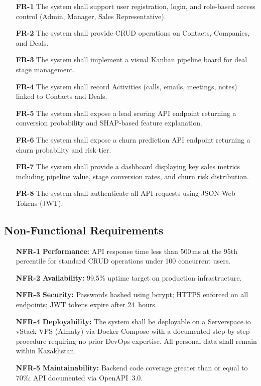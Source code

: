 \begin{itemize}
  \item[\textbf{FR-1}] The system shall support user registration, login,
  and role-based access control (Admin, Manager, Sales Representative).
  \item[\textbf{FR-2}] The system shall provide CRUD operations on
  Contacts, Companies, and Deals.
  \item[\textbf{FR-3}] The system shall implement a visual Kanban pipeline
  board for deal stage management.
  \item[\textbf{FR-4}] The system shall record Activities (calls, emails,
  meetings, notes) linked to Contacts and Deals.
  \item[\textbf{FR-5}] The system shall expose a lead scoring API endpoint
  returning a conversion probability and SHAP-based feature explanation.
  \item[\textbf{FR-6}] The system shall expose a churn prediction API
  endpoint returning a churn probability and risk tier.
  \item[\textbf{FR-7}] The system shall provide a dashboard displaying key
  sales metrics including pipeline value, stage conversion rates, and churn
  risk distribution.
  \item[\textbf{FR-8}] The system shall authenticate all API requests using
  JSON Web Tokens (JWT).
\end{itemize}

\subsection{Non-Functional Requirements}

\begin{itemize}
  \item[\textbf{NFR-1}] \textbf{Performance:} API response time less than
  500\,ms at the 95th percentile for standard CRUD operations under 100
  concurrent users.
  \item[\textbf{NFR-2}] \textbf{Availability:} 99.5\% uptime target on
  production infrastructure.
  \item[\textbf{NFR-3}] \textbf{Security:} Passwords hashed using bcrypt;
  HTTPS enforced on all endpoints; JWT tokens expire after 24~hours.
  \item[\textbf{NFR-4}] \textbf{Deployability:} The system shall be
  deployable on a Serverspace.io vStack VPS (Almaty) via Docker Compose
  with a documented step-by-step procedure requiring no prior DevOps
  expertise. All personal data shall remain within Kazakhstan.
  \item[\textbf{NFR-5}] \textbf{Maintainability:} Backend code coverage
  greater than or equal to 70\%; API documented via OpenAPI~3.0.
\end{itemize}

